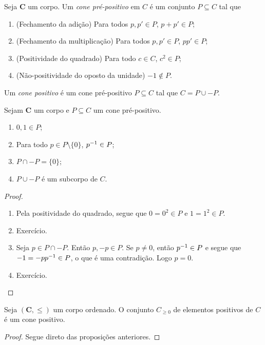 \begin{definition}
Seja $\bm C$ um corpo. Um \emph{cone pré-positivo} em $C$ é um conjunto $P \subseteq C$ tal que
	\begin{enumerate}
	\item (Fechamento da adição) Para todos $p,p' \in P$, $p+p' \in P$;
	\item (Fechamento da multiplicação) Para todos $p,p' \in P$, $pp' \in P$;
	\item (Positividade do quadrado) Para todo $c \in C$, $c^2 \in P$;
	\item (Não-positividade do oposto da unidade) $-1 \notin P$.
	\end{enumerate}

Um \emph{cone positivo} é um cone pré-positivo $P \subseteq C$ tal que $C = P \cup -P$.
\end{definition}

\begin{proposition}
Sejam $\bm C$ um corpo e $P \subseteq C$ um cone pré-positivo.
	\begin{enumerate}
	\item $0,1 \in P$;
	\item Para todo $p \in P \setminus \{0\}$, $p ^{-1} \in P$;
	\item $P \cap -P = \{0\}$;
	\item $P \cup -P$ é um subcorpo de $C$.
	\end{enumerate}
\end{proposition}
\begin{proof}
	\begin{enumerate}
	\item Pela positividade do quadrado, segue que $0=0^2 \in P$ e $1=1^2 \in P$.

	\item Exercício.%

	\item Seja $p \in P \cap -P$. Então $p,-p \in P$. Se $p \neq 0$, então $p^{-1} \in P$ e segue que $-1 = -pp^{-1} \in P$, o que é uma contradição. Logo $p=0$.

	\item Exercício.

	\end{enumerate}
\end{proof}

\begin{proposition}
Seja $(\bm C,\leq)$ um corpo ordenado. O conjunto $C_{\geq  0}$ de elementos positivos de $C$ é um cone positivo.
\end{proposition}
\begin{proof}
Segue direto das proposições anteriores.
\end{proof}


